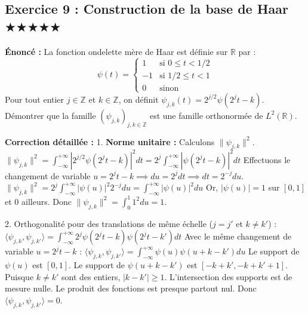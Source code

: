 \documentclass[11pt,a4paper]{article}
\begin{document}
\subsection*{Exercice 9 : Construction de la base de Haar $\bigstar\bigstar\bigstar\bigstar\bigstar$}

\textbf{Énoncé :}
La fonction ondelette mère de Haar est définie sur $\mathbb{R}$ par :
$$ \psi(t) = \begin{cases} 1 & \text{si } 0 \leq t < 1/2 \\ -1 & \text{si } 1/2 \leq t < 1 \\ 0 & \text{sinon} \end{cases} $$
Pour tout entier $j \in \mathbb{Z}$ et $k \in \mathbb{Z}$, on définit $\psi_{j,k}(t) = 2^{j/2} \psi(2^j t - k)$.
Démontrer que la famille $(\psi_{j,k})_{j,k \in \mathbb{Z}}$ est une famille orthonormée de $L^2(\mathbb{R})$.

\textbf{Correction détaillée :}
1. \textbf{Norme unitaire :} Calculons $\|\psi_{j,k}\|^2$.
   $\|\psi_{j,k}\|^2 = \int_{-\infty}^{+\infty} |2^{j/2} \psi(2^j t - k)|^2 dt = 2^j \int_{-\infty}^{+\infty} |\psi(2^j t - k)|^2 dt$
   Effectuons le changement de variable $u = 2^j t - k \implies du = 2^j dt \implies dt = 2^{-j} du$.
   $\|\psi_{j,k}\|^2 = 2^j \int_{-\infty}^{+\infty} |\psi(u)|^2 2^{-j} du = \int_{-\infty}^{+\infty} |\psi(u)|^2 du$
   Or, $|\psi(u)| = 1$ sur $[0, 1]$ et $0$ ailleurs. Donc $\|\psi_{j,k}\|^2 = \int_0^1 1^2 du = 1$.

2. \textit{}Orthogonalité pour des translations de même échelle ($j = j'$ et $k \neq k'$) :\textit{}
   $\langle \psi_{j,k}, \psi_{j,k'} \rangle = \int_{-\infty}^{+\infty} 2^j \psi(2^j t - k) \psi(2^j t - k') dt$
   Avec le même changement de variable $u = 2^j t - k$ :
   $\langle \psi_{j,k}, \psi_{j,k'} \rangle = \int_{-\infty}^{+\infty} \psi(u) \psi(u + k - k') du$
   Le support de $\psi(u)$ est $[0, 1]$. Le support de $\psi(u + k - k')$ est $[-k+k', -k+k'+1]$.
   Puisque $k \neq k'$ sont des entiers, $|k - k'| \geq 1$. L'intersection des supports est de mesure nulle. Le produit des fonctions est presque partout nul.
   Donc $\langle \psi_{j,k}, \psi_{j,k'} \rangle = 0$.
\end{document}
